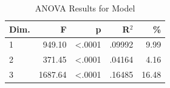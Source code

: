 \begin{table}[H]
  \centering
  \caption{ANOVA Results for Model}
  \label{tab:anova_model}
  \begin{tabular}{l r r r r}
    Dim. & F & p & R$^2$ & \% \\
    \hline
    1 & 949.10 & <.0001 & .09992 & 9.99 \\
    2 & 371.45 & <.0001 & .04164 & 4.16 \\
    3 & 1687.64 & <.0001 & .16485 & 16.48 \\
  \end{tabular}
\end{table}
